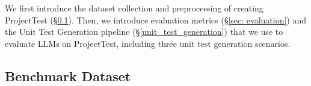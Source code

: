 
We first
introduce the dataset collection and preprocessing of creating ProjectTest (\S\ref{data_collection_preprocessing}). Then, we introduce evaluation metrics (\S\ref{sec: evaluation}) and the Unit Test Generation pipeline (\S\ref{unit_test_generation}) that we use to evaluate LLMs on ProjectTest, including three unit test generation scenarios.

% 


% 

\subsection{Benchmark Dataset}
\label{data_collection_preprocessing}

% 

